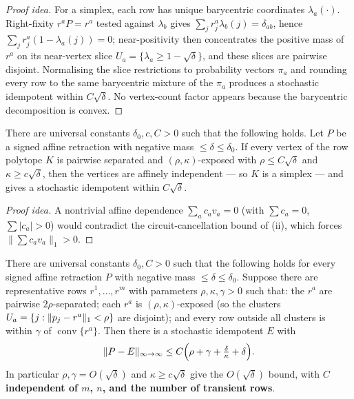 \begin{proof}[Proof idea]
For a simplex, each row has unique barycentric coordinates $\lambda_a(\cdot)$.
Right-fixity $r^aP=r^a$ tested against $\lambda_b$ gives
$\sum_j r^a_j\lambda_b(j)=\delta_{ab}$, hence $\sum_j r^a_j(1-\lambda_a(j))=0$;
near-positivity then concentrates the positive mass of $r^a$ on its near-vertex
slice $U_a=\{\lambda_a\ge1-\sqrt\delta\}$, and these slices are pairwise
disjoint. Normalising the slice restrictions to probability vectors $\pi_a$ and
rounding every row to the same barycentric mixture of the $\pi_a$ produces a
stochastic idempotent within $C\sqrt\delta$. No vertex-count factor appears
because the barycentric decomposition is convex.
\end{proof}

\begin{theorem}\label{thm:well-exposed}
There are universal constants $\delta_0,c,C>0$ such that the following holds.
Let $P$ be a signed affine retraction with negative mass
$\le\delta\le\delta_0$. If every vertex of the row polytope $K$ is pairwise
separated and $(\rho,\kappa)$-exposed with $\rho\le C\sqrt\delta$ and
$\kappa\ge c\sqrt\delta$, then the vertices are affinely independent --- so
$K$ is a simplex --- and  gives a stochastic idempotent within
$C\sqrt\delta$.
\end{theorem}

\begin{proof}[Proof idea]
A nontrivial affine dependence $\sum_a c_a v_a=0$ (with $\sum c_a=0$,
$\sum|c_a|>0$) would contradict the circuit-cancellation bound of
(ii), which forces $\lVert\sum c_a v_a\rVert_1>0$.
\end{proof}

\begin{theorem}\label{thm:cluster}
There are universal constants $\delta_0,C>0$ such that the following holds for
every signed affine retraction $P$ with negative mass $\le\delta\le\delta_0$.
Suppose there are representative rows $r^1,\dots,r^m$ with parameters
$\rho,\kappa,\gamma>0$ such that: the $r^a$ are pairwise $2\rho$-separated; each
$r^a$ is $(\rho,\kappa)$-exposed (so the clusters
$U_a=\{j:\lVert p_j-r^a \rVert_1<\rho\}$ are disjoint); and every row outside all
clusters is within $\gamma$ of $\operatorname{conv}\{r^a\}$. Then there is a
stochastic idempotent $E$ with
\[
  \lVert P-E \rVert_{\infty\to\infty}\le C\Bigl(\rho+\gamma+\tfrac{\delta}{\kappa}+\delta\Bigr).
\]
In particular $\rho,\gamma=O(\sqrt\delta)$ and $\kappa\ge c\sqrt\delta$ give the
$O(\sqrt\delta)$ bound, with $C$ \textbf{independent of $m$, $n$, and the number
of transient rows}.
\end{theorem}

